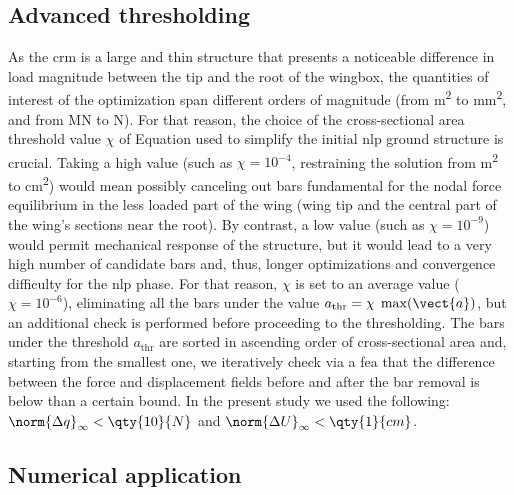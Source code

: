\subsection{Advanced thresholding}
As the \gls{crm} is a large and thin structure that presents a noticeable difference in load magnitude between the tip and the root of the wingbox, the quantities of interest of the optimization span different orders of magnitude (from \unit{m^2} to \unit{mm^2}, and from \unit{MN} to \unit{N}). For that reason, the choice of the cross-sectional area threshold value $\chi$ of Equation  used to simplify the initial \gls{nlp} ground structure is crucial. Taking a high value (such as $\chi = 10^{-4}$, restraining the solution from \unit{m^2} to \unit{cm^2}) would mean possibly canceling out bars fundamental for the nodal force equilibrium in the less loaded part of the wing (wing tip and the central part of the wing's sections near the root). By contrast, a low value (such as $\chi=10^{-9}$) would permit  mechanical response of the structure, but it would lead to a very high number of candidate bars and, thus, longer optimizations and convergence difficulty for the \gls{nlp} phase. For that reason, $\chi$ is set to an average value ($\chi=10^{-6}$), eliminating all the bars under the value $a_{\text{thr}}=\chi \; \max(\vect{a})$, but an additional check is performed before proceeding to the thresholding. The bars under the threshold $a_{\text{thr}}$ are sorted in ascending order of cross-sectional area and, starting from the smallest one, we iteratively check via a \gls{fea} that the difference between the force and displacement fields before and after the bar removal is below than a certain bound. In the present study we used the following: $\norm{\Delta q}_{\infty}<\qty{10}{N}$ and $\norm{\Delta U}_{\infty}<\qty{1}{cm}$.

\subsection{Numerical application}

